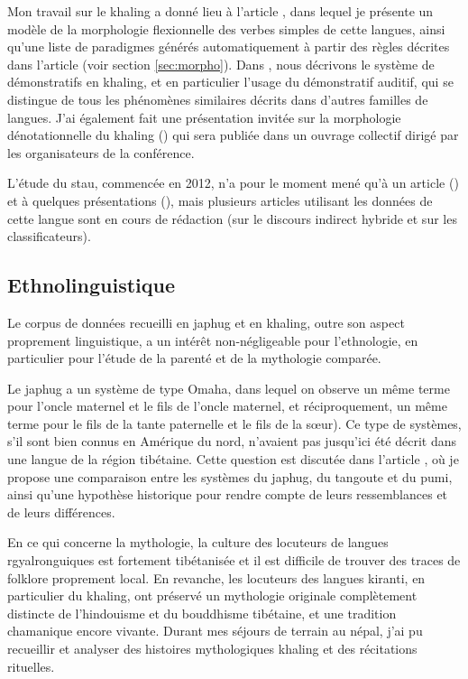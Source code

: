 \documentclass[oldfontcommands,oneside,a4paper,11pt]{article}
\begin{document}
Mon travail sur le khaling a donné lieu à l'article \citet{jacques12khaling}, dans lequel je présente un modèle de la morphologie flexionnelle des verbes simples de cette langues, ainsi qu'une liste de paradigmes générés automatiquement à partir des règles décrites dans l'article (voir section \ref{sec:morpho}). Dans \citet{jacques14auditory}, nous décrivons le système de démonstratifs en khaling, et en particulier l'usage du démonstratif auditif, qui se distingue de tous les phénomènes similaires décrits dans d'autres familles de langues. J'ai également fait une présentation invitée sur la morphologie dénotationnelle du khaling (\citealt{jacques13derivational.khaling}) qui sera publiée dans un ouvrage collectif dirigé par les organisateurs de la conférence.

L'étude du stau, commencée en 2012, n'a pour le moment mené qu'à un article (\citealt{jacques14rtau}) et à quelques présentations (\citealt{antonov14rtau}), mais plusieurs articles utilisant les données de cette langue sont en cours de rédaction (sur le discours indirect hybride et sur les classificateurs).
 
\subsection{Ethnolinguistique}  \label{sec:ethno}
Le corpus de données recueilli en japhug et en khaling, outre son aspect proprement linguistique, a un intérêt non-négligeable pour l'ethnologie, en particulier pour l'étude de la parenté et de la mythologie comparée.

Le japhug a un système de type Omaha, dans lequel on observe un même terme pour l'oncle maternel et le fils de l'oncle maternel, et réciproquement, un même terme pour le fils de la tante paternelle et le fils de la sœur). Ce type de systèmes, s'il sont bien connus en Amérique du nord, n'avaient pas jusqu'ici   été décrit dans une langue de la région tibétaine. Cette question est discutée dans l'article \citet{jacques11kinship}, où je propose une comparaison entre les systèmes du japhug, du tangoute et du pumi, ainsi qu'une hypothèse historique pour rendre compte de leurs ressemblances et de leurs différences.

En ce qui concerne la mythologie,    la culture des locuteurs de langues rgyalronguiques est fortement tibétanisée et il est difficile de trouver des traces de folklore proprement local. En revanche, les locuteurs des langues kiranti, en particulier du khaling, ont préservé un mythologie originale complètement distincte de l'hindouisme et du bouddhisme tibétaine, et une tradition chamanique encore vivante. Durant mes séjours de terrain au népal, j'ai pu recueillir et analyser des histoires mythologiques khaling et des récitations rituelles.
\end{document}
